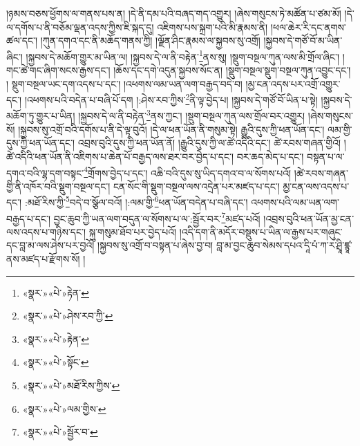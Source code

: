 །ཉམས་བཅས་ཕྱོགས་ལ་གནས་པས་ན། །དེ་ནི་དམ་པའི་བཞད་གད་འགྱུར། །ཞེས་གསུངས་ཏེ་མཚོན་པ་ཙམ་མོ། །དེ་ལ་དགོས་པ་ནི་བཅོམ་ལྡན་འདས་ཀྱིས་ཇི་སྐད་དུ། འཇིགས་པས་སྐྲག་པའི་མི་རྣམས་ནི། །ཕལ་ཆེར་རི་དང་ནགས་ཚལ་དང་། །ཀུན་དགའ་དང་ནི་མཆོད་གནས་ཀྱི། །ལྗོན་ཤིང་རྣམས་ལ་སྐྱབས་སུ་འགྲོ། །སྐྱབས་དེ་གཙོ་བོ་མ་ཡིན་ཞིང་། །སྐྱབས་དེ་མཆོག་གྱུར་མ་ཡིན་ལ། །སྐྱབས་དེ་ལ་ནི་བརྟེན་\footnote{«སྣར་»«པེ་»རྟེན་}ནས་སུ། །སྡུག་བསྔལ་ཀུན་ལས་མི་གྲོལ་ཞིང་། །གང་ཚེ་གང་ཞིག་སངས་རྒྱས་དང་། །ཆོས་དང་དགེ་འདུན་སྐྱབས་སོང་ན། །སྡུག་བསྔལ་སྡུག་བསྔལ་ཀུན་འབྱུང་དང་། །
སྡུག་བསྔལ་ཡང་དག་འདས་པ་དང་། །འཕགས་ལམ་ཡན་ལག་བརྒྱད་བདེ་བ། །མྱ་ངན་འདས་པར་འགྲོ་འགྱུར་དང་། །འཕགས་པའི་བདེན་པ་བཞི་པོ་དག །:ཤེས་རབ་ཀྱིས་\footnote{«སྣར་»«པེ་»ཤེས་རབ་ཀྱི་}ནི་ལྟ་བྱེད་པ། །སྐྱབས་དེ་གཙོ་བོ་ཡིན་པ་སྟེ། །སྐྱབས་དེ་མཆོག་ཏུ་གྱུར་པ་ཡིན། །སྐྱབས་དེ་ལ་ནི་བརྟེན་\footnote{«སྣར་»«པེ་»རྟེན་}ནས་ཀྱང་། །སྡུག་བསྔལ་ཀུན་ལས་གྲོལ་བར་འགྱུར། །ཞེས་གསུངས་སོ། །སྐྱབས་སུ་འགྲོ་བའི་དགོས་པ་ནི་དེ་ལྟ་བུའོ། །དེ་ལ་ཕན་ཡོན་ནི་གསུམ་སྟེ། རྒྱུའི་དུས་ཀྱི་ཕན་ཡོན་དང་། ལམ་གྱི་དུས་ཀྱི་ཕན་ཡོན་དང་། འབྲས་བུའི་དུས་ཀྱི་ཕན་ཡོན་ནོ། །རྒྱུའི་དུས་ཀྱི་ལ་ཚེ་འདིའི་དང་། ཚེ་རབས་གཞན་གྱིའོ། །ཚེ་འདིའི་ཕན་ཡོན་ནི་འཇིགས་པ་ཆེན་པོ་བརྒྱད་ལས་ཐར་བར་བྱེད་པ་དང་། བར་ཆད་མེད་པ་དང་། བསྟན་པ་ལ་དགའ་བའི་ལྷ་དག་བསྟང་\footnote{«སྣར་»«པེ་»སྟོང་}གྲོགས་བྱེད་པ་དང་། འཆི་བའི་དུས་སུ་ཡིད་དགའ་བ་ལ་སོགས་པའོ། །ཚེ་རབས་གཞན་གྱི་ནི་འཁོར་བའི་སྡུག་བསྔལ་དང་། ངན་སོང་གི་སྡུག་བསྔལ་ལས་འདྲེན་པར་མཛད་པ་དང་། མྱ་ངན་ལས་འདས་པ་དང་། :མཐོ་རིས་ཀྱི་\footnote{«སྣར་»«པེ་»མཐོ་རིས་ཀྱིས་}བདེ་བ་སྩོལ་བའོ། །:ལམ་གྱི་\footnote{«སྣར་»«པེ་»ལམ་གྱིས་}ཕན་ཡོན་བདེན་པ་བཞི་དང་། འཕགས་པའི་ལམ་ཡན་ལག་བརྒྱད་པ་དང་། བྱང་ཆུབ་ཀྱི་ཡན་ལག་བདུན་ལ་སོགས་པ་ལ་:སྦྱོར་བར་\footnote{«སྣར་»«པེ་»སྦྱོར་བ་}མཛད་པའོ། །འབྲས་བུའི་ཕན་ཡོན་མྱ་ངན་ལས་འདས་པ་གཉིས་དང་། སྐུ་གསུམ་ཐོབ་པར་བྱེད་པའོ། །འདི་དག་ནི་མདོར་བསྡུས་པ་ཡིན་ལ་རྒྱས་པར་གཞུང་དང་བླ་མ་ལས་ཤེས་པར་བྱའོ། །སྐྱབས་སུ་འགྲོ་བ་བསྟན་པ་ཞེས་བྱ་བ། བླ་མ་བྱང་ཆུབ་སེམས་དཔའ་དཱི་པཾ་ཀ་ར་ཤྲཱི་ཛྙཱ་ནས་མཛད་པ་རྫོགས་སོ། ། 